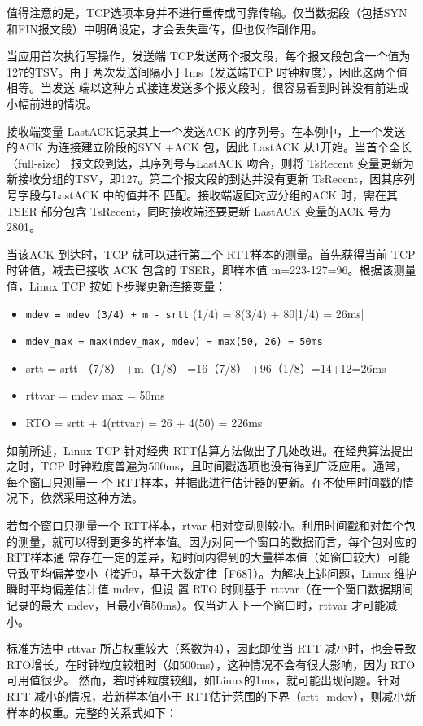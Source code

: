 值得注意的是，TCP选项本身并不进行重传或可靠传输。仅当数据段（包括SYN 和FIN报文段）中明确设定，才会丢失重传，但也仅作副作用。

当应用首次执行写操作，发送端 TCP发送两个报文段，每个报文段包含一个值为127的TSV。由于两次发送间隔小于1ms（发送端TCP 时钟粒度），因此这两个值相等。当发送
端以这种方式接连发送多个报文段时，很容易看到时钟没有前进或小幅前进的情况。

接收端变量 LastACK记录其上一个发送ACK 的序列号。在本例中，上一个发送的ACK 为连接建立阶段的SYN +ACK 包，因此 LastACK 从1开始。当首个全长（full-size）
报文段到达，其序列号与LastACK 吻合，则将 TsRecent 变量更新为新接收分组的TSV，即127。第二个报文段的到达并没有更新 TsRecent，因其序列号字段与LastACK 中的值并不
匹配。接收端返回对应分组的ACK 时，需在其 TSER 部分包含 TsRecent，同时接收端还要更新 LastACK 变量的ACK 号为2801。

当该ACK 到达时，TCP 就可以进行第二个 RTT样本的测量。首先获得当前 TCP 时钟值，减去已接收 ACK 包含的 TSER，即样本值 m=223-127=96。根据该测量值，Linux
TCP 按如下步骤更新连接变量：

\begin{itemize}
    \item \verb|mdev = mdev (3/4) + m - srtt| (1/4) = 8(3/4) + 80|1/4) = 26ms|
    \item \verb|mdev_max = max(mdev_max, mdev) = max(50, 26) = 50ms|
    \item srtt = srtt （7/8） +m（1/8） =16（7/8） +96（1/8）=14+12=26ms
    \item rttvar = mdev max = 50ms
    \item RTO = srtt + 4(rttvar) = 26 + 4(50) = 226ms
\end{itemize}

如前所述，Linux TCP 针对经典 RTT估算方法做出了几处改进。在经典算法提出之时，TCP 时钟粒度普遍为500ms，且时间戳选项也没有得到广泛应用。通常，每个窗口只测量一
个 RTT样本，并据此进行估计器的更新。在不使用时间戳的情况下，依然采用这种方法。

若每个窗口只测量一个 RTT样本，rtvar 相对变动则较小。利用时间戳和对每个包的测量，就可以得到更多的样本值。因为对同一个窗口的数据而言，每个包对应的RTT样本通
常存在一定的差异，短时间内得到的大量样本值（如窗口较大）可能导致平均偏差变小（接近0，基于大数定律［F68］）。为解决上述问题，Linux 维护瞬时平均偏差估计值 mdev，但设
置 RTO 时则基于 rttvar（在一个窗口数据期间记录的最大 mdev，且最小值50ms）。仅当进入下一个窗口时，rttvar 才可能减小。

标准方法中 rttvar 所占权重较大（系数为4），因此即使当 RTT 减小时，也会导致 RTO增长。在时钟粒度较粗时（如500ms），这种情况不会有很大影响，因为 RTO 可用值很少。
然而，若时钟粒度较细，如Linux的1ms，就可能出现问题。针对 RTT 减小的情况，若新样本值小于 RTT估计范围的下界（srtt -mdev），则减小新样本的权重。完整的关系式如下：

